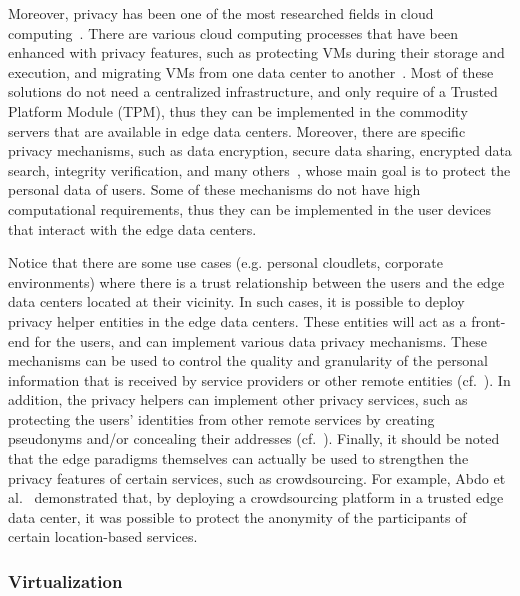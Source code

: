 \documentclass[twocolumn,preprint,3p]{elsarticle}
\begin{document}
Moreover, privacy has been one of the most researched fields in cloud computing~\cite{CruzSP15}. There are various cloud computing processes that have been enhanced with privacy features, such as protecting VMs during their storage and execution, and migrating VMs from one data center to another~\cite{Ali15}. Most of these solutions do not need a centralized infrastructure, and only require of a Trusted Platform Module (TPM), thus they can be implemented in the commodity servers that are available in edge data centers. Moreover, there are specific privacy mechanisms, such as data encryption, secure data sharing, encrypted data search, integrity verification, and many others~\cite{Sun15}, whose main goal is to protect the personal data of users. Some of these mechanisms do not have high computational requirements, thus they can be implemented in the user devices that interact with the edge data centers.

Notice that there are some use cases (e.g. personal cloudlets, corporate environments) where there is a trust relationship between the users and the edge data centers located at their vicinity. In such cases, it is possible to deploy privacy helper entities in the edge data centers. These entities will act as a front-end for the users, and can implement various data privacy mechanisms. These mechanisms can be used to control the quality and granularity of the personal information that is received by service providers or other remote entities (cf.~\cite{Seneviratne13,Page14}). In addition, the privacy helpers can implement other privacy services, such as protecting the users' identities from other remote services by creating pseudonyms and/or concealing their addresses (cf.~\cite{Hassan15}). Finally, it should be noted that the edge paradigms themselves can actually be used to strengthen the privacy features of certain services, such as crowdsourcing. For example, Abdo et al.~\cite{Abdo15} demonstrated that, by deploying a crowdsourcing platform in a trusted edge data center, it was possible to protect the anonymity of the participants of certain location-based services.

\subsubsection{Virtualization}
\end{document}
